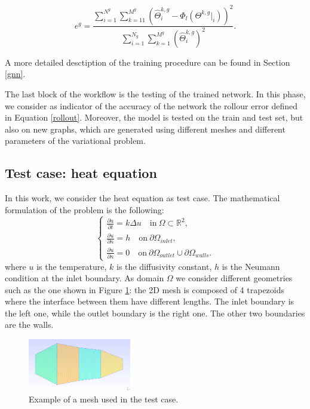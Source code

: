 \documentclass[11pt,a4paper]{article}
\begin{document}
\begin{equation}
    e^g = \frac{ \sum_{i=1}^{N^g} \sum_{k=11}^{M^g} (\hat{\Theta}_i^{k,g} -  \Phi_l(\Theta^{k,g}|_i))^2 }{ \sum_{i=1}^{N_g} \sum_{k=1}^{M^g} (\hat{\Theta}_i^{k,g})^2 }.
    \label{rollout}
\end{equation}

A more detailed desctiption of the training procedure can be found in Section \ref{gnn}. 

The last block of the workflow is the testing of the trained network. In this phase, we consider as indicator of the accuracy of the network the rollour error defined in Equation \eqref{rollout}. 
Moreover, the model is tested on the train and test set, but also on new graphs, which are generated using different meshes and different parameters of the variational problem. 


\subsection{Test case: heat equation}
\label{testcase}

In this work, we consider the heat equation as test case. 
The mathematical formulation of the problem is the following:
\begin{equation}
    \begin{cases}
        \frac{\partial u }{\partial t} = k \Delta u \quad \text{in} \ \Omega \subset \mathbb{R}^2, \\
        \frac{\partial u}{\partial n} = h \quad \text{on} \ \partial \Omega_{inlet}, \\
        \frac{\partial u}{\partial n} = 0 \quad \text{on} \ \partial \Omega_{outlet} 
        \cup \partial \Omega_{walls}.
    \end{cases}
\end{equation}
where \(u\) is the temperature, \(k\) is the diffusivity constant, \(h\) is the Neumann condition at the inlet boundary. As domain \(\Omega\) we consider different geometries such as the one shown in Figure \ref{mesh}: the 2D mesh is composed of 4 trapezoids where the interface between them have different lengths. The inlet boundary is the left one, while the outlet boundary is the right one. The other two boundaries are the walls.

\begin{figure}[H]
    \centering
    \includegraphics[width=0.4\textwidth]{Images/mesh.png}
    \caption{Example of a mesh used in the test case.}
    \label{mesh}
\end{figure}
\end{document}

